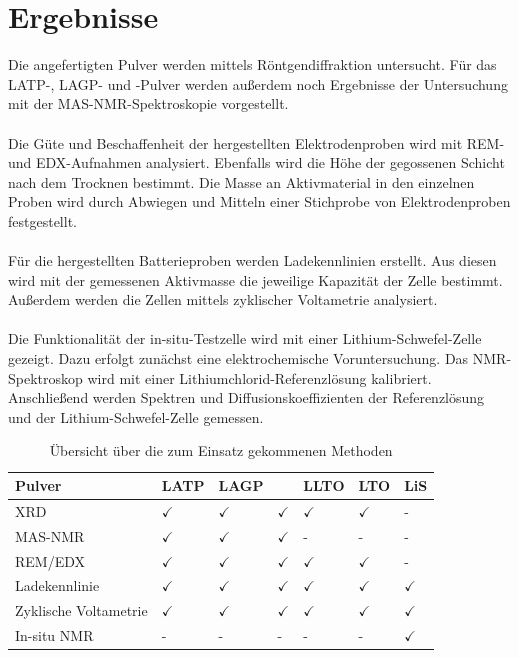 \documentclass[a4paper, 11pt, headsepline,footsepline,twoside,abstract]{scrbook}
\begin{document}
\chapter{Ergebnisse}
Die angefertigten Pulver werden mittels Röntgendiffraktion untersucht. Für das LATP-, LAGP- und -Pulver werden außerdem noch Ergebnisse der Untersuchung mit der MAS-NMR-Spektroskopie vorgestellt.
\\\\
Die Güte und Beschaffenheit der hergestellten Elektrodenproben wird mit REM- und EDX-Aufnahmen analysiert. Ebenfalls wird die Höhe der gegossenen Schicht nach dem Trocknen bestimmt. Die Masse an Aktivmaterial in den einzelnen Proben wird durch Abwiegen und Mitteln einer Stichprobe von Elektrodenproben festgestellt.
\\\\
%
Für die hergestellten Batterieproben werden Ladekennlinien erstellt. Aus diesen wird mit der gemessenen Aktivmasse die jeweilige Kapazität der Zelle bestimmt. Außerdem werden die Zellen mittels zyklischer Voltametrie analysiert.
\\\\
Die Funktionalität der in-situ-Testzelle wird mit einer Lithium-Schwefel-Zelle gezeigt. Dazu erfolgt zunächst eine elektrochemische Voruntersuchung. Das NMR-Spektroskop wird mit einer Lithiumchlorid-Referenzlösung kalibriert. Anschließend werden Spektren und Diffusionskoeffizienten der Referenzlösung und der Lithium-Schwefel-Zelle gemessen.
\vspace{0.2cm}
\begin{table}[h]
\centering
\begin{tabular}{L{3.8cm} C{1.4cm}C{1.4cm}C{1.4cm}C{1.4cm}C{1.4cm}C{1.4cm}}
\toprule
 \textbf{Pulver}&\textbf{LATP} & \textbf{LAGP} & \textbf{}& \textbf{LLTO}& \textbf{LTO}& \textbf{LiS} \\
\midrule
XRD& $\checkmark$ & $\checkmark$ & $\checkmark$& $\checkmark$& $\checkmark$& - \\
\midrule
MAS-NMR& $\checkmark$ & $\checkmark$ & $\checkmark$& - &- & - \\
\midrule
REM/EDX& $\checkmark$ & $\checkmark$ & $\checkmark$& $\checkmark$& $\checkmark$& - \\
\midrule
Ladekennlinie& $\checkmark$ & $\checkmark$ & $\checkmark$& $\checkmark$& $\checkmark$& $\checkmark$ \\
\midrule
Zyklische Voltametrie& $\checkmark$ & $\checkmark$ & $\checkmark$& $\checkmark$& $\checkmark$& $\checkmark$ \\
\midrule
In-situ NMR& - & - & - & - & - & $\checkmark$ \\
\bottomrule
\end{tabular}
 \caption{Übersicht über die zum Einsatz gekommenen Methoden}
 \label{tabelle_methoden_pulver}
\end{table} 
\end{document}
